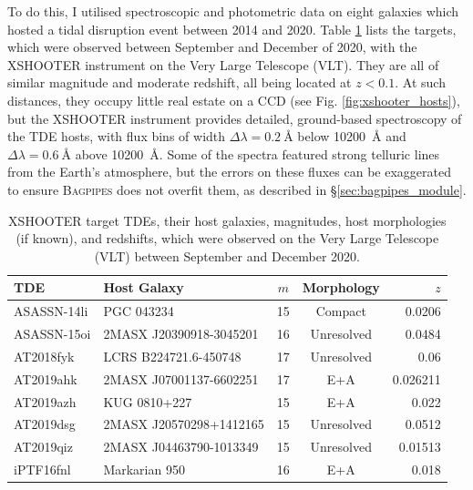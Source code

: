 \documentclass[a4paper,11pt]{article}
\begin{document}
To do this, I utilised spectroscopic and photometric data on eight galaxies which hosted a tidal disruption event between 2014 and 2020. Table \ref{tab:xshooter_data} lists the targets, which were observed between September and December of 2020, with the XSHOOTER instrument on the Very Large Telescope (VLT). They are all of similar magnitude and moderate redshift, all  being located at $z<0.1$. At such distances, they occupy little real estate on a CCD (see Fig. \ref{fig:xshooter_hosts}), but the XSHOOTER instrument provides detailed, ground-based spectroscopy of the TDE hosts, with flux bins of width $\Delta\lambda=\SI{0.2}{\angstrom}$ below \SI{10200}{\angstrom} and $\Delta\lambda=\SI{0.6}{\angstrom}$ above \SI{10200}{\angstrom}. Some of the spectra featured strong telluric lines from the Earth's atmosphere, but the errors on these fluxes can be exaggerated to ensure \textsc{Bagpipes} does not overfit them, as described in \S \ref{sec:bagpipes_module}.

\begin{table}[H]
  \centering
  \begin{tabular}{l l c c r}
    TDE         & Host Galaxy             & $m$ & Morphology & $z$      \\
    \hline \hline
    ASASSN-14li & PGC 043234              & 15  & Compact    & 0.0206   \\
    ASASSN-15oi & 2MASX J20390918-3045201 & 16  & Unresolved & 0.0484   \\
    AT2018fyk   & LCRS B224721.6-450748   & 17  & Unresolved & 0.06     \\
    AT2019ahk   & 2MASX J07001137-6602251 & 17  & E+A        & 0.026211 \\
    AT2019azh   & KUG 0810+227            & 15  & E+A        & 0.022    \\
    AT2019dsg   & 2MASX J20570298+1412165 & 15  & Unresolved & 0.0512   \\
    AT2019qiz   & 2MASX J04463790-1013349 & 15  & Unresolved & 0.01513  \\
    iPTF16fnl   & Markarian 950           & 16  & E+A        & 0.018    \\
    \hline
  \end{tabular}
  \caption{
  XSHOOTER target TDEs, their host galaxies, magnitudes, host morphologies
  (if known), and redshifts, which were observed on the Very Large Telescope
  (VLT) between September and December 2020.\cite{Zwicky_1975, Jose_2014,
  Holoien_2016a, Arcavi_2015, Holoien_2016b, Wevers_2021, Cacella_2019,
  Holoien_2019, van_Velzen_2019, Perez_Torres_2019, Seibert_2019, Gezari_2016, Blagorodnova_2017}
  }
  \label{tab:xshooter_data}
\end{table}
\end{document}
